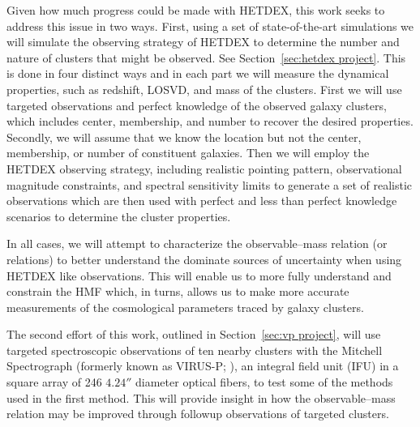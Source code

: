 \documentclass[12pt]{article}
\begin{document}
Given how much progress could be made with HETDEX, this work seeks to address this issue in two ways. First, using a set of state-of-the-art simulations we will simulate the observing strategy of HETDEX to determine the number and nature of clusters that might be observed. See Section~\ref{sec:hetdex project}. This is done in four distinct ways and in each part we will measure the dynamical properties, such as redshift, LOSVD, and mass of the clusters. First we will use targeted observations and perfect knowledge of the observed galaxy clusters, which includes center, membership, and number to recover the desired properties. Secondly, we will assume that we know the location but not the center, membership, or number of constituent galaxies. Then we will employ the HETDEX observing strategy, including realistic pointing pattern, observational magnitude constraints, and spectral sensitivity limits to generate a set of realistic observations which are then used with perfect and less than perfect knowledge scenarios to determine the cluster properties. 

In all cases, we will attempt to characterize the observable--mass relation (or relations) to better understand the dominate sources of uncertainty when using HETDEX like observations. This will enable us to more fully understand and constrain the HMF which, in turns, allows us to make more accurate measurements of the cosmological parameters traced by galaxy clusters.

The second effort of this work, outlined in Section~\ref{sec:vp project}, will use targeted spectroscopic observations of ten nearby clusters with the Mitchell Spectrograph (formerly known as VIRUS-P; \citealt{Hill2008a}), an integral field unit (IFU) in a square array of 246 $4.24''$ diameter optical fibers, to test some of the methods used in the first method. This will provide insight in how the observable--mass relation may be improved through followup observations of targeted clusters.
\end{document}
